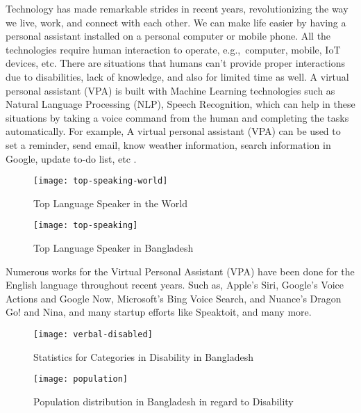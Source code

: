 Technology has made remarkable strides in recent years, revolutionizing the way we live, work, and connect with each other.
We can make life easier by having a personal assistant installed on a personal computer or mobile phone.
All the technologies require human interaction to operate, e.g.,\ computer, mobile, IoT devices, etc.
There are situations that humans can't provide proper interactions due to disabilities, lack of knowledge, and also for limited time as well.
A virtual personal assistant (VPA) is built with Machine Learning technologies such as Natural Language Processing (NLP), Speech Recognition, which can help in these situations by taking a voice command from the human and completing the tasks automatically.
For example, A virtual personal assistant (VPA) can be used to set a reminder, send email, know weather information, search information in Google, update to-do list, etc \cite{adheetee}.

\begin{figure}
    \centering
    \texttt{[image: top-speaking-world]}
    \caption{Top Language Speaker in the World}\label{fig:top-speaking-world}
\end{figure}

\begin{figure}
    \centering
    \texttt{[image: top-speaking]}
    \caption{Top Language Speaker in Bangladesh}\label{fig:top-speaking}
\end{figure}

Numerous works for the Virtual Personal Assistant (VPA) have been done for the English language throughout recent years.
Such as, Apple’s Siri\cite{siri}, Google’s Voice Actions\cite{google-mobile} and Google Now\cite{google-now}, Microsoft’s Bing Voice Search\cite{microsoft-tellme}, and Nuance’s Dragon Go! \cite{nuance-dragon} and Nina\cite{nuance-nina}, and many startup efforts like Speaktoit\cite{speaktoit}, and many more.

\begin{figure}
    \centering
    \texttt{[image: verbal-disabled]}
    \caption{Statistics for Categories in Disability in Bangladesh}\label{fig:verbal-disabled}
\end{figure}

\begin{figure}
    \centering
    \texttt{[image: population]}
    \caption{Population distribution in Bangladesh in regard to Disability}\label{fig:polation}
\end{figure}

